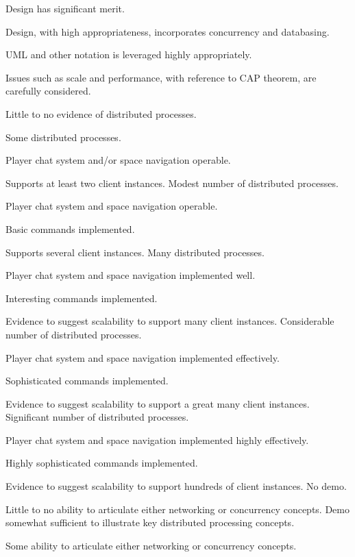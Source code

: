 \documentclass{../../fal_assignment}
\begin{document}
\begin{markingrubric}
        \grade 		Design has significant merit.
            \par 		Design, with high appropriateness, incorporates concurrency and databasing.  
          \par 		UML and other notation is leveraged highly appropriately.
            \par 		Issues such as scale and performance, with reference to CAP theorem, are carefully considered.

%
        \grade\fail Little to no evidence of distributed processes.

        \grade Some distributed processes.
	\par  Player chat system and/or space navigation operable.
	\par  Supports at least two client instances.
        \grade Modest number of distributed processes.
	\par  Player chat system and space navigation operable.
	\par  Basic commands implemented.
	\par  Supports several client instances.
        \grade Many distributed processes.
	\par  Player chat system and space navigation implemented well.
	\par  Interesting commands implemented.
	\par  Evidence to suggest scalability to support many client instances.
        \grade Considerable number of distributed processes.
	\par  Player chat system and space navigation implemented effectively.
	\par  Sophisticated commands implemented.
	\par  Evidence to suggest scalability to support a great many client instances.
        \grade Significant number of distributed processes.
	\par  Player chat system and space navigation implemented highly effectively.
	\par  Highly sophisticated commands implemented.
	\par  Evidence to suggest scalability to support hundreds of client instances.
%
        \grade\fail No demo.
            \par Little to no ability to articulate either networking or concurrency concepts.
        \grade Demo somewhat sufficient to illustrate key distributed processing concepts.
            \par Some ability to articulate either networking or concurrency concepts.

\end{markingrubric}
\end{document}
